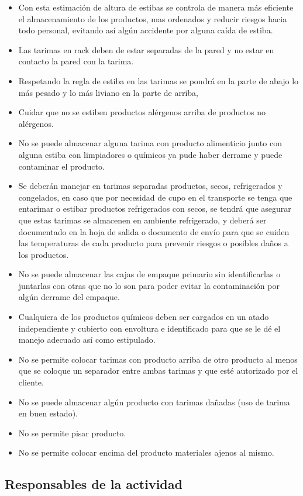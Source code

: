 \begin{itemize}
	\item Con esta estimación de altura de estibas se controla de manera más eficiente el almacenamiento de los productos, mas ordenados y reducir riesgos hacia todo personal, evitando así algún accidente por alguna caída de estiba.
	\item Las tarimas en rack deben de estar separadas de la pared y no estar en contacto la pared con la tarima.
	\item Respetando la regla de estiba en las tarimas se pondrá en la parte de abajo lo más pesado y lo más liviano en la parte de arriba,
	\item Cuidar que no se estiben productos alérgenos arriba de productos no alérgenos.
	\item No se puede almacenar alguna tarima con producto alimenticio junto con alguna estiba con limpiadores o químicos ya pude haber derrame y puede contaminar el producto.
	\item Se deberán manejar en tarimas separadas productos, secos, refrigerados y congelados, en caso que por necesidad de cupo en el transporte se tenga que entarimar o estibar productos refrigerados con secos, se tendrá que asegurar que estas tarimas se almacenen en ambiente refrigerado, y deberá ser documentado en la hoja de salida o documento de envío para que se cuiden las temperaturas de cada producto para prevenir riesgos o posibles daños a los productos.
	\item No se puede almacenar las cajas de empaque primario sin identificarlas o juntarlas con otras que no lo son para poder evitar la contaminación por algún derrame del empaque.
	\item Cualquiera de los productos químicos deben ser cargados en un atado independiente y cubierto con envoltura e identificado para que se le dé el manejo adecuado así como estipulado.
	\item No se permite colocar tarimas con producto arriba de otro producto al menos que se coloque un separador entre ambas tarimas y que esté autorizado por el cliente.
	\item No se puede almacenar algún producto con tarimas dañadas (uso de tarima en buen estado).
	\item No se permite pisar producto.
	\item No se permite colocar encima del producto materiales ajenos al mismo.
\end{itemize}

\subsection{Responsables de la actividad}

